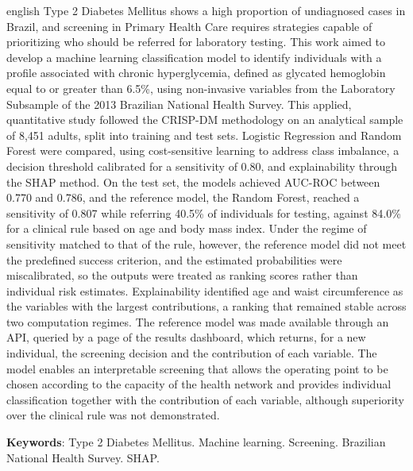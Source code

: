 \begin{resumo}[Abstract]
	\SingleSpacing
	\begin{otherlanguage*}{english}
		Type 2 Diabetes Mellitus shows a high proportion of undiagnosed cases in Brazil, and screening in Primary Health Care requires strategies capable of prioritizing who should be referred for laboratory testing. This work aimed to develop a machine learning classification model to identify individuals with a profile associated with chronic hyperglycemia, defined as glycated hemoglobin equal to or greater than 6.5\%, using non-invasive variables from the Laboratory Subsample of the 2013 Brazilian National Health Survey. This applied, quantitative study followed the CRISP-DM methodology on an analytical sample of 8,451 adults, split into training and test sets. Logistic Regression and Random Forest were compared, using cost-sensitive learning to address class imbalance, a decision threshold calibrated for a sensitivity of 0.80, and explainability through the SHAP method. On the test set, the models achieved AUC-ROC between 0.770 and 0.786, and the reference model, the Random Forest, reached a sensitivity of 0.807 while referring 40.5\% of individuals for testing, against 84.0\% for a clinical rule based on age and body mass index. Under the regime of sensitivity matched to that of the rule, however, the reference model did not meet the predefined success criterion, and the estimated probabilities were miscalibrated, so the outputs were treated as ranking scores rather than individual risk estimates. Explainability identified age and waist circumference as the variables with the largest contributions, a ranking that remained stable across two computation regimes. The reference model was made available through an API, queried by a page of the results dashboard, which returns, for a new individual, the screening decision and the contribution of each variable. The model enables an interpretable screening that allows the operating point to be chosen according to the capacity of the health network and provides individual classification together with the contribution of each variable, although superiority over the clinical rule was not demonstrated.
		
		\textbf{Keywords}: Type 2 Diabetes Mellitus. Machine learning. Screening. Brazilian National Health Survey. SHAP.
	\end{otherlanguage*}
\end{resumo}

% 
%
%  

